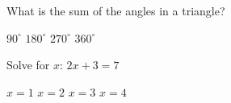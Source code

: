 \documentclass[12pt]{exam}
\begin{document}
\begin{center}
\end{center}

\vspace{0.2in}

\begin{questions}

\question[2]
What is the sum of the angles in a triangle?

\begin{choices}
  \choice $90^\circ$
  \choice $180^\circ$
  \choice $270^\circ$
  \choice $360^\circ$
\end{choices}

\question[3]
Solve for $x$: $2x + 3 = 7$

\begin{choices}
  \choice $x = 1$
  \choice $x = 2$
  \choice $x = 3$
  \choice $x = 4$
\end{choices}


\end{questions}
\end{document}
